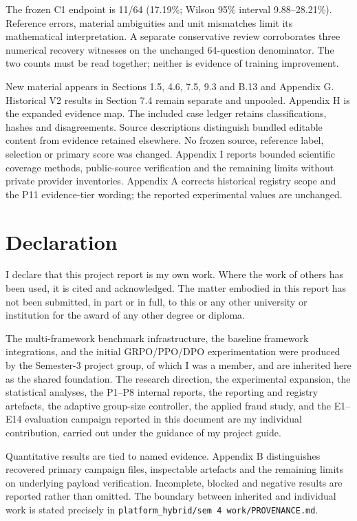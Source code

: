 \documentclass[12pt,a4paper]{report}
\begin{document}
The frozen C1 endpoint is 11/64 (17.19\%; Wilson 95\% interval 9.88--28.21\%). Reference errors, material ambiguities and unit mismatches limit its mathematical interpretation. A separate conservative review corroborates three numerical recovery witnesses on the unchanged 64-question denominator. The two counts must be read together; neither is evidence of training improvement.

New material appears in Sections 1.5, 4.6, 7.5, 9.3 and B.13 and Appendix G. Historical V2 results in Section 7.4 remain separate and unpooled. Appendix H is the expanded evidence map. The included case ledger retains classifications, hashes and disagreements. Source descriptions distinguish bundled editable content from evidence retained elsewhere. No frozen source, reference label, selection or primary score was changed. Appendix I reports bounded scientific coverage methods, public-source verification and the remaining limits without private provider inventories. Appendix A corrects historical registry scope and the P11 evidence-tier wording; the reported experimental values are unchanged.

\chapter*{Declaration}
\thispagestyle{plain}

I declare that this project report is my own work. Where the work of others has
been used, it is cited and acknowledged. The matter embodied in this report has
not been submitted, in part or in full, to this or any other university or
institution for the award of any other degree or diploma.

The multi-framework benchmark infrastructure, the baseline framework
integrations, and the initial GRPO/PPO/DPO experimentation were produced by the
Semester-3 project group, of which I was a member, and are inherited here as
the shared foundation. The research direction, the experimental expansion, the
statistical analyses, the P1--P8 internal reports, the reporting and registry
artefacts, the adaptive group-size controller, the applied fraud study, and the
E1--E14 evaluation campaign reported in this document are my
individual contribution, carried out under the guidance of my project guide.

Quantitative results are tied to named evidence. Appendix B distinguishes
recovered primary campaign files, inspectable artefacts and the remaining
limits on underlying payload verification. Incomplete, blocked and negative
results are reported rather than omitted. The boundary between inherited and
individual work is stated precisely in \texttt{platform\_hybrid/sem 4
work/PROVENANCE.md}.
\end{document}
